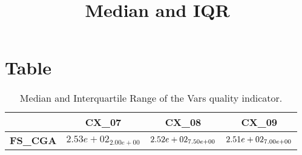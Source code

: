 \documentclass{article}
\title{Median and IQR}
\author{}
\begin{document}
\maketitle
\section{Table}
\begin{table}[!htp]
  \caption{Median and Interquartile Range of the Vars quality indicator.}
  \label{table:Vars}
  \centering
  \begin{scriptsize}
  \begin{tabular}{c|ccc}
      & \textbf{CX\_07} & \textbf{CX\_08} & \textbf{CX\_09} \\\hline
      \textbf{FS_CGA} & $2.53e+02_{2.00e+00} $ & $ \cellcolor{gray95} 2.52e+02_{7.50e+00} $ & $ \cellcolor{gray25} 2.51e+02_{7.00e+00}$ \\
  \end{tabular}
  \end{scriptsize}
\end{table}
\end{document}
